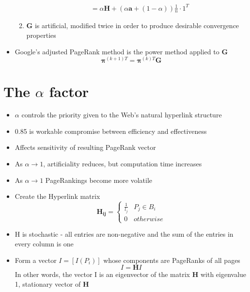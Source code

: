 \documentclass[11pt]{report}
\begin{document}
\begin{itemize}
\begin{enumerate}
\begin{equation}
\begin{split}
&= \alpha\textbf{H} + (\alpha\textbf{a}+(1-\alpha))\frac{1}{n}\cdot1^T
\end{split}
\end{equation}
\item \textbf{G} is artificial, modified twice in order to produce desirable convergence properties
\end{enumerate}
\item Google's adjusted PageRank method is the power method applied to \textbf{G} \begin{equation}
\boldsymbol{\pi}^{(k+1)T} = \boldsymbol{\pi}^{(k)T}\textbf{G}
\end{equation}
\end{itemize}
\section {The $\alpha$ factor}
\begin{itemize}
\item $\alpha$ controls the priority given to the Web's natural hyperlink structure
\item 0.85 is workable compromise between efficiency and effectiveness
\item Affects sensitivity of resulting PageRank vector
\item As $\alpha\rightarrow 1$, artificiality reduces, but computation time increases
\item As $\alpha\rightarrow 1$ PageRankings become more volatile
\end{itemize}
\begin{itemize}
\item Create the Hyperlink matrix
\begin{equation}
\boldsymbol{H_{ij}} = \begin{cases} \frac{1}{l_j} & P_j\in B_{i} \\ 0 & otherwise\end{cases}
\end{equation}
\item H is stochastic - all entries are non-negative and the sum of the entries in every column is one
\item Form a vector $I=[I(P_i)]$ whose components are PageRanks of all pages \begin{equation}
I=\textbf{H}I 
\end{equation} In other words, the vector I is an eigenvector of the matrix \textbf{H} with eigenvalue 1, stationary vector of \textbf{H}
\end{itemize}
\end{document}
